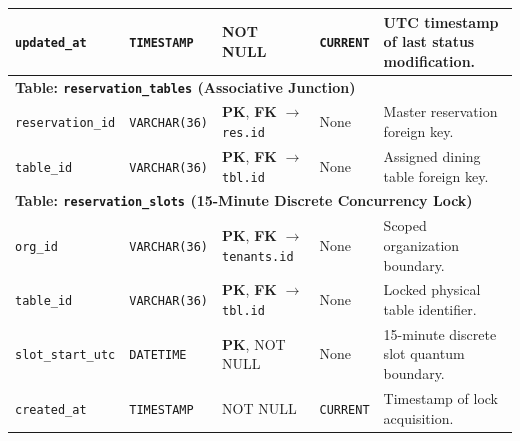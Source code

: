 \begin{table}[htbp]
\begin{tabularx}{\textwidth}{llp{3.2cm}lX}
\texttt{updated\_at} & \texttt{TIMESTAMP} & NOT NULL & \texttt{CURRENT} & UTC timestamp of last status modification. \\
\midrule
\multicolumn{5}{l}{\textbf{Table: \texttt{reservation\_tables} (Associative Junction)}} \\
\texttt{reservation\_id}& \texttt{VARCHAR(36)}& \textbf{PK}, \textbf{FK} $\to$ \texttt{res.id} & None & Master reservation foreign key. \\
\texttt{table\_id} & \texttt{VARCHAR(36)}& \textbf{PK}, \textbf{FK} $\to$ \texttt{tbl.id} & None & Assigned dining table foreign key. \\
\midrule
\multicolumn{5}{l}{\textbf{Table: \texttt{reservation\_slots} (15-Minute Discrete Concurrency Lock)}} \\
\texttt{org\_id} & \texttt{VARCHAR(36)}& \textbf{PK}, \textbf{FK} $\to$ \texttt{tenants.id} & None & Scoped organization boundary. \\
\texttt{table\_id} & \texttt{VARCHAR(36)}& \textbf{PK}, \textbf{FK} $\to$ \texttt{tbl.id} & None & Locked physical table identifier. \\
\texttt{slot\_start\_utc}& \texttt{DATETIME}& \textbf{PK}, NOT NULL & None & 15-minute discrete slot quantum boundary. \\
\texttt{created\_at} & \texttt{TIMESTAMP} & NOT NULL & \texttt{CURRENT} & Timestamp of lock acquisition. \\
\bottomrule
\end{tabularx}
\end{table}

